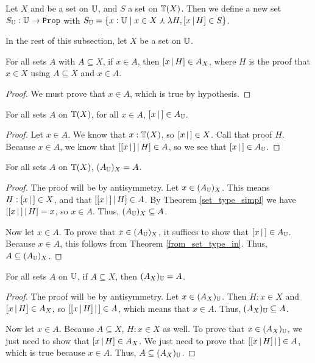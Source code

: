 \documentclass[../../math.tex]{subfiles}
\begin{document}
\begin{definition}
    Let $X$ and be a set on $\mathbb{U}$, and $S$ a set on $\mathbb{T}(X)$.  Then we define a
    new set $S_\U : \U \rightarrow \Prop$ with $S_{\mathbb{U}} = \{x : \mathbb{U} \mid x \in X
    \curlywedge \lambda H, [ x \, | \, H ] \in S\}$.
\end{definition}

In the rest of this subsection, let $X$ be a set on $\mathbb{U}$.

\begin{theorem} \label{to_set_type_in}
    For all sets $A$ with $A \subseteq X$, if $x \in A$, then $[ x \, | \, H ] \in
    A_X$, where $H$ is the proof that $x \in X$ using $A \subseteq X$ and $x \in
    A$.
\end{theorem}
\begin{proof}
    We must prove that $x \in A$, which is true by hypothesis.
\end{proof}

\begin{theorem} \label{from_set_type_in}
    For all sets $A$ on $\mathbb{T}(X)$, for all $x \in A$, $[ x\, |\,] \in A_{\mathbb{U}}$.
\end{theorem}
\begin{proof}
    Let $x \in A$.  We know that $x : \mathbb{T}(X)$, so $[ x\, |\,] \in X$.  Call that
    proof $H$.  Because $x \in A$, we know that $[ [ x\, |\,] \, | \, H ] \in A$, so we
    see that $[ x\, |\,] \in A_{\mathbb{U}}$.
\end{proof}

\begin{theorem} \label{to_from_set_type}
    For all sets $A$ on $\mathbb{T}(X)$, $(A_{\mathbb{U}})_X = A$.
\end{theorem}
\begin{proof}
    The proof will be by antisymmetry.  Let $x \in (A_{\mathbb{U}})_X$.  This means $H :
    [ x\, |\,] \in X$, and that $[ [ x\, |\,] \, | \, H ] \in A$.  By Theorem
    \ref{set_type_simpl} we have $[ [ x\, |\,] \, | \, H ] = x$, so $x \in A$.  Thus,
    $(A_{\mathbb{U}})_X \subseteq A$.

    Now let $x \in A$.  To prove that $x \in (A_{\mathbb{U}})_X$, it suffices to show that
    $[ x\, |\,] \in A_{\mathbb{U}}$.  Because $x \in A$, this follows from Theorem
    \ref{from_set_type_in}.  Thus, $A \subseteq (A_{\mathbb{U}})_X$.
\end{proof}

\begin{theorem} \label{from_to_set_type}
    For all sets $A$ on $\mathbb{U}$, if $A \subseteq X$, then $(A_X)_{\mathbb{U}} = A$.
\end{theorem}
\begin{proof}
    The proof will be by antisymmetry.  Let $x \in (A_X)_{\mathbb{U}}$.  Then $H : x \in
    X$ and $[ x \, | \, H ] \in A_X$, so $[ [ x \, | \, H ]\, |\,] \in A$, which means that $x
    \in A$.  Thus, $(A_X)_{\mathbb{U}} \subseteq A$.

    Now let $x \in A$.  Because $A \subseteq X$, $H : x \in X$ as well.  To
    prove that $x \in (A_X)_{\mathbb{U}}$, we just need to show that $[ x \, | \, H ] \in A_X$.
    We just need to prove that $[ [ x \, | \, H ]\, |\,] \in A$, which is true because $x
    \in A$.  Thus, $A \subseteq (A_X)_{\mathbb{U}}$.
\end{proof}
\end{document}
